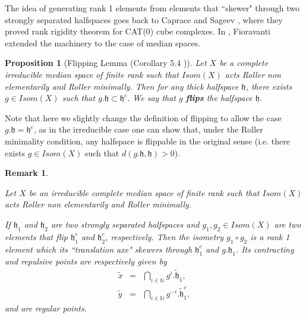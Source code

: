 \documentclass{amsart}
\numberwithin{equation}{section}
\newtheorem{prop}[thm]{Proposition}
\newtheorem{rmk}[thm]{Remark}
\newcommand{\hh}{\mathfrak{h}}    %
\newcommand{\NN}{\mathbb{N}}      %
\theoremstyle{definition}
\begin{document}
The idea of generating rank 1 elements from elements that ``skewer" through two strongly separated halfspaces goes back to Caprace and Sageev \cite{SagC}, where they proved rank rigidity theorem for CAT(0) cube complexes. In \cite{Fior_tits}, Fioravanti extended the machinery to the case of median spaces.
\begin{prop}[Flipping Lemma (Corollary 5.4 \cite{Fior_tits})]\label{lem_flipping_lemma}
    Let $X$ be a complete irreducible median space of finite rank such that $Isom(X)$ acts Roller non elementarily and Roller minimally. Then for any thick halfspace $\hh$, there exists $g\in Isom(X)$ such that $g.\hh\subset \hh^c$. We say that $g$ \textbf{\textit{flips}} the halfspace $\hh$.
 \end{prop}
Note that here we slightly change the definition of flipping to allow the case $g.\hh=\hh^c$, as in the irreducible case one can show that, under the Roller minimality condition, any halfspace is flippable in the original sense (i.e. there exists $g\in Isom(X)$ such that $d(g.\hh,\hh)>0$).
 \begin{rmk} \label{rmk_construction_regular_point}

Let $X$ be an irreducible complete median space of finite rank such that $Isom(X)$ acts Roller non elementarily and Roller minimally. \par 
If $\hh_1$ and $\hh_2$ are two strongly separated halfspaces and $g_1,g_2\in Isom(X)$ are two elements that flip $\hh_1^c$ and $\hh_2^c$, respectively. Then the isometry $g_1\circ g_2$ is a rank 1 element which its ``translation axe" skewers through $\hh_1^c$ and $g.\hh_1$. Its contracting and repulsive points are respectively given by 
 \begin{eqnarray*}
     \tilde{x}&=&\bigcap_{i\in\NN}g^i.\tilde{\hh}_1, \\
     \tilde{y}&=&\bigcap_{i\in\NN}g^{-i}.\tilde{\hh}^c_1,
 \end{eqnarray*}
and are regular points.
 

 \end{rmk}
\end{document}
